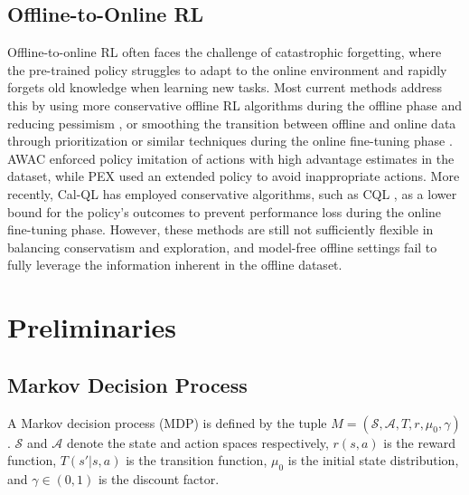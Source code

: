 \documentclass[letterpaper]{article} %
\begin{document}
\subsection{Offline-to-Online RL}
Offline-to-online RL often faces the challenge of catastrophic forgetting, where the pre-trained policy struggles to adapt to the online environment and rapidly forgets old knowledge when learning new tasks. Most current methods address this by using more conservative offline RL algorithms during the offline phase and reducing pessimism \cite{e2o}, or smoothing the transition between offline and online data through prioritization or similar techniques during the online fine-tuning phase \cite{balancedreplay}. AWAC \cite{awac} enforced policy imitation of actions with high advantage estimates in the dataset, while PEX \cite{pex} used an extended policy to avoid inappropriate actions. More recently, Cal-QL \cite{calql} has employed conservative algorithms, such as CQL \cite{cql}, as a lower bound for the policy's outcomes to prevent performance loss during the online fine-tuning phase. However, these methods are still not sufficiently flexible in balancing conservatism and exploration, and model-free offline settings fail to fully leverage the information inherent in the offline dataset.


\section{Preliminaries}

\subsection{Markov Decision Process}

A Markov decision process (MDP) is defined by the tuple \( M = (\mathcal{S}, \mathcal{A}, T, r, \mu_0, \gamma) \). \( \mathcal{S} \) and \( \mathcal{A} \) denote the state and action spaces respectively, \( r(s, a) \) is the reward function, \( T(s'|s, a) \) is the transition function, \( \mu_0 \) is the initial state distribution, and \( \gamma \in (0, 1) \) is the discount factor. %
\end{document}

